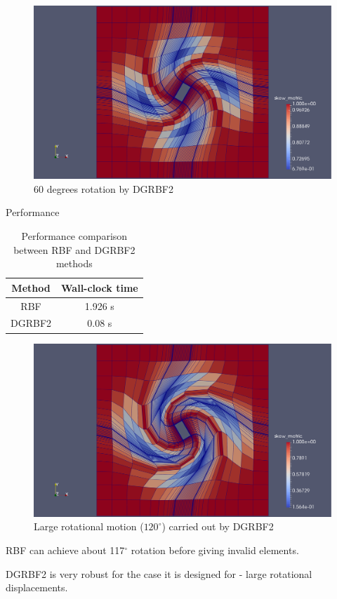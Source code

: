\documentclass[t,12pt]{beamer}
\begin{document}
\begin{frame}
	 \begin{figure}
	 	\centering
	 	\includegraphics[scale=0.2]{qin-60-dgrbf2-quality.pdf}
	 	\caption{60 degrees rotation by DGRBF2}
	 	\label{fig:qin-60-dgrbf2}
	 \end{figure}
\end{frame}

\begin{frame}{Performance}
	\begin{table}[h!]
		\centering
		\begin{tabular}{|c|c|}
			\hline
			Method & Wall-clock time \\
			\hline
			RBF   &   1.926 s \\
			DGRBF2 &  0.08 s \\
			\hline
		\end{tabular}
		\caption{Performance comparison between RBF and DGRBF2 methods}
	\end{table}
\end{frame}

\begin{frame}
	\begin{figure}
		\centering
		\includegraphics[scale=0.2]{qin-120-quality-withmesh.pdf}
		\caption{Large rotational motion ($120^\circ$) carried out by DGRBF2}
		\label{fig:qin-dgrbf2-120}
	\end{figure}
	RBF can achieve about 117$^\circ$ rotation before giving invalid elements.
	
	DGRBF2 is very robust for the case it is designed for - large rotational displacements.
\end{frame}
\end{document}

